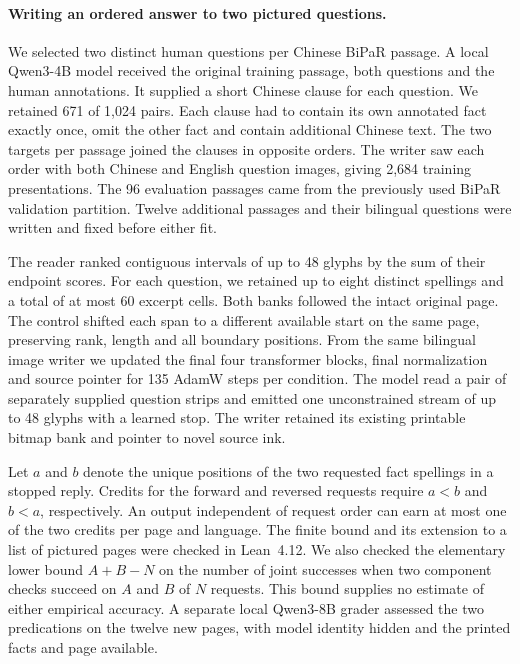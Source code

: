 \documentclass[12pt,a4paper]{article}
\providecommand{\DIFadd}[1]{{\protect\color{blue} \sf #1}} %
\begin{document}
\paragraph{\DIFadd{Writing an ordered answer to two pictured questions.}}
\DIFadd{We selected two distinct human questions per Chinese BiPaR passage. A local Qwen3-4B model received the original training passage, both questions and the human annotations. It supplied a short Chinese clause for each question. We retained 671 of 1,024 pairs. Each clause had to contain its own annotated fact exactly once, omit the other fact and contain additional Chinese text. The two targets per passage joined the clauses in opposite orders. The writer saw each order with both Chinese and English question images, giving 2,684 training presentations. The 96 evaluation passages came from the previously used BiPaR validation partition. Twelve additional passages and their bilingual questions were written and fixed before either fit.
}

\DIFadd{The reader ranked contiguous intervals of up to 48 glyphs by the sum of their endpoint scores. For each question, we retained up to eight distinct spellings and a total of at most 60 excerpt cells. Both banks followed the intact original page. The control shifted each span to a different available start on the same page, preserving rank, length and all boundary positions. From the same bilingual image writer we updated the final four transformer blocks, final normalization and source pointer for 135 AdamW steps per condition. The model read a pair of separately supplied question strips and emitted one unconstrained stream of up to 48 glyphs with a learned stop. The writer retained its existing printable bitmap bank and pointer to novel source ink.
}

\DIFadd{Let $a$ and $b$ denote the unique positions of the two requested fact spellings in a stopped reply. Credits for the forward and reversed requests require $a<b$ and $b<a$, respectively. An output independent of request order can earn at most one of the two credits per page and language. The finite bound and its extension to a list of pictured pages were checked in Lean~4.12. We also checked the elementary lower bound $A+B-N$ on the number of joint successes when two component checks succeed on $A$ and $B$ of $N$ requests. This bound supplies no estimate of either empirical accuracy. A separate local Qwen3-8B grader assessed the two predications on the twelve new pages, with model identity hidden and the printed facts and page available.
}
\end{document}
